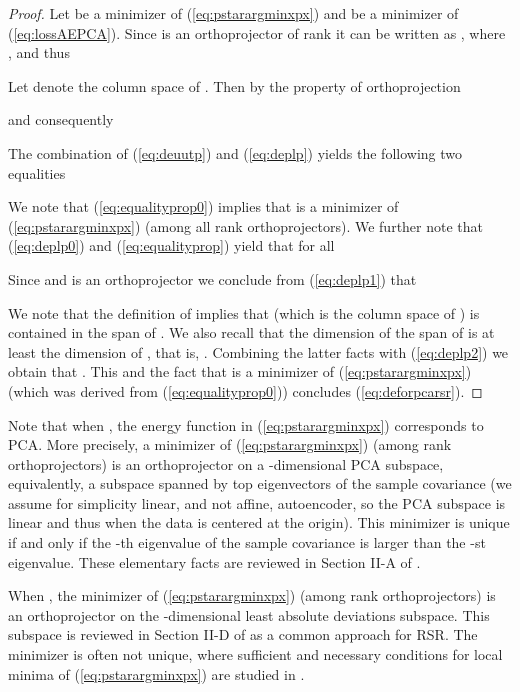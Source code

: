 \documentclass{article} \usepackage{iclr2020_conference,times}
\def\eqref#1{(\ref{#1})}
\begin{document}
\begin{proof}
Let  be a minimizer of \eqref{eq:pstarargminxpx} and 
 be a minimizer of \eqref{eq:lossAEPCA}. Since  is an orthoprojector of rank  it can be written as , where , and thus


Let  denote the column space of . Then by the property of orthoprojection

and consequently



The combination of \eqref{eq:deuutp} and \eqref{eq:deplp} yields the following two equalities


We note that \eqref{eq:equalityprop0} implies  that  is a minimizer of \eqref{eq:pstarargminxpx} (among all rank  orthoprojectors).
We further note that \eqref{eq:deplp0} and \eqref{eq:equalityprop} yield that for all 


Since  and  is an orthoprojector we conclude from \eqref{eq:deplp1} that 

We note that the definition of  implies that  (which is the column space of  
) is contained in the span of  . We also recall that the dimension of the span of   is at least the dimension of , that is, . Combining the latter facts with \eqref{eq:deplp2} we obtain that . 
This and the fact that  is a minimizer of \eqref{eq:pstarargminxpx} (which was derived from \eqref{eq:equalityprop0}) 
concludes \eqref{eq:deforpcarsr}.

\end{proof}

Note that when , the energy function in \eqref{eq:pstarargminxpx} corresponds to 
PCA. More precisely, a minimizer 
of \eqref{eq:pstarargminxpx} (among rank  orthoprojectors) is an orthoprojector on a -dimensional PCA subspace, equivalently, a subspace spanned by top  eigenvectors of the sample covariance (we assume for simplicity linear, and not affine, autoencoder, so the PCA subspace is linear and thus when  the data is centered at the origin).  This minimizer is unique if and only if the -th eigenvalue of the sample covariance is larger than the -st eigenvalue. These elementary facts are reviewed in Section II-A
of \citet{lerman2018overview}.

When , the minimizer 
of \eqref{eq:pstarargminxpx} (among rank  orthoprojectors) is an orthoprojector on the -dimensional least absolute deviations subspace.
This subspace is reviewed in Section II-D of   \citet{lerman2018overview} as a common approach for RSR. 
The minimizer is often not unique, where sufficient and necessary conditions for local minima of \eqref{eq:pstarargminxpx} are studied in \citet{lp_recovery_part1_11}.
\end{document}
